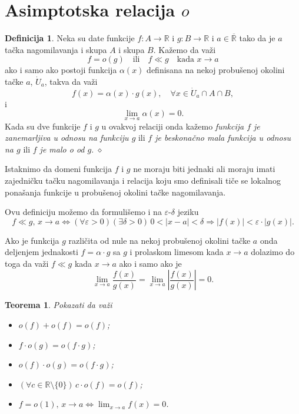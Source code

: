 \documentclass[a4paper,12pt]{article}
\theoremstyle{plain}
\newtheorem{theorem}{Teorema}[section]
\theoremstyle{definition}
\newtheorem{definition}{Definicija}[section]
\theoremstyle{remark}
\begin{document}
\section{Asimptotska relacija \texorpdfstring{$o$}{o}}
\begin{definition}
Neka su date funkcije $f : A \rightarrow \mathbb{R}$ i $g : B \rightarrow \mathbb{R}$ i $a \in \overline{\mathbb{R}}$ tako da je $a$ tačka nagomilavanja i skupa $A$ i skupa $B$. Kažemo da važi
$$f = o(g) \quad \text{ili} \quad f \ll g \quad \text{kada } x \to a$$
ako i samo ako postoji funkcija $\alpha(x)$ definisana na nekoj probušenoj okolini tačke $a$, $\dot{U}_a$, takva da važi
$$f(x) = \alpha(x) \cdot g(x), \quad \forall x \in \dot{U}_a \cap A \cap B,$$
i
$$\lim_{x \to a} \alpha(x) = 0.$$
Kada su dve funkcije $f$ i $g$ u ovakvoj relaciji onda kažemo \textit{funkcija $f$ je zanemarljiva u odnosu na funkciju $g$} ili \textit{$f$ je beskonačno mala funkcija u odnosu na $g$} ili \textit{$f$ je malo o od $g$}. $\diamond$
\end{definition}

Istaknimo da domeni funkcija $f$ i $g$ ne moraju biti jednaki ali moraju imati zajedničku tačku nagomilavanja i relacija koju smo definisali tiče se lokalnog ponašanja funkcije u probušenoj okolini tačke nagomilavanja.

Ovu definiciju možemo da formulišemo i na $\varepsilon$-$\delta$ jeziku
$$f \ll g, \, x \to a \iff (\forall \varepsilon > 0)(\exists \delta > 0) \, 0 < |x - a| < \delta \Rightarrow |f(x)| < \varepsilon \cdot |g(x)|.$$

Ako je funkcija $g$ različita od nule na nekoj probušenoj okolini tačke $a$ onda deljenjem jednakosti $f = \alpha \cdot g$ sa $g$ i prolaskom limesom kada $x \to a$ dolazimo do toga da važi $f \ll g$ kada $x \to a$ ako i samo ako je
$$\lim_{x \to a} \frac{f(x)}{g(x)} = \lim_{x \to a} \left| \frac{f(x)}{g(x)} \right| = 0.$$

\begin{theorem}
Pokazati da važi
\begin{itemize}
    \item[a)] $o(f) + o(f) = o(f)$;
    \item[b)] $f \cdot o(g) = o(f \cdot g)$;
    \item[v)] $o(f) \cdot o(g) = o(f \cdot g)$;
    \item[g)] $(\forall c \in \mathbb{R} \setminus \{0\}) \, c \cdot o(f) = o(f)$;
    \item[d)] $f = o(1), \, x \to a \iff \lim_{x \to a} f(x) = 0$.
\end{itemize}
\end{theorem}
\end{document}
